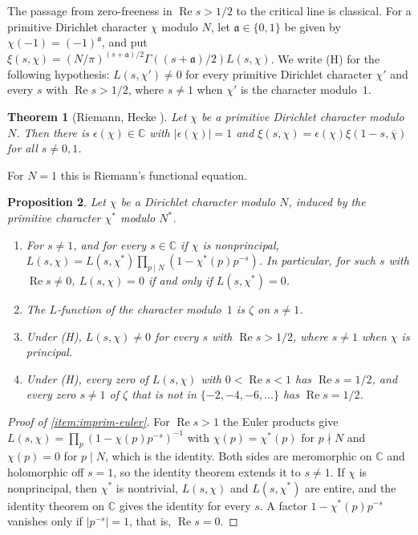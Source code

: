 \documentclass[11pt]{amsbook}
\theoremstyle{plain}
\newtheorem{theorem}{Theorem}[section]
\newtheorem{proposition}[theorem]{Proposition}
\theoremstyle{definition}
\theoremstyle{remark}
\numberwithin{equation}{section}
\numberwithin{figure}{chapter}
\numberwithin{table}{chapter}
\renewcommand{\C}{\mathbb{C}}
\begin{document}
The passage from zero-freeness in $\operatorname{Re}s>1/2$ to the
critical line is classical. For a primitive Dirichlet character $\chi$
modulo $N$, let $\mathfrak a\in\{0,1\}$ be given by
$\chi(-1)=(-1)^{\mathfrak a}$, and put
$\xi(s,\chi)=(N/\pi)^{(s+\mathfrak a)/2}\Gamma((s+\mathfrak a)/2)
L(s,\chi)$.
We write (H) for the following hypothesis: $L(s,\chi')\ne0$ for every
primitive Dirichlet character $\chi'$ and every $s$ with
$\operatorname{Re}s>1/2$, where $s\ne1$ when $\chi'$ is the character
modulo~$1$.

\begin{theorem}[Riemann, Hecke \cite{Davenport2000,Riemann1859}]
\label{thm:fe}
Let $\chi$ be a primitive Dirichlet character modulo $N$. Then there is
$\epsilon(\chi)\in\C$ with $|\epsilon(\chi)|=1$ and
$\xi(s,\chi)=\epsilon(\chi)\xi(1-s,\overline\chi)$ for all $s\ne0,1$.
\end{theorem}

\noindent For $N=1$ this is Riemann's functional equation.

\begin{proposition}\label{prop:imprimitive}
Let $\chi$ be a Dirichlet character modulo $N$, induced by the
primitive character $\chi^*$ modulo $N^*$.
\begin{enumerate}[label=(\alph*)]
\item\label{item:imprim-euler} For $s\ne1$, and for every $s\in\C$ if
$\chi$ is nonprincipal,
$L(s,\chi)=L(s,\chi^*)\prod_{p\mid N}(1-\chi^*(p)p^{-s})$. In
particular, for such $s$ with $\operatorname{Re}s\ne0$, $L(s,\chi)=0$
if and only if $L(s,\chi^*)=0$.
\item\label{item:imprim-zeta} The $L$-function of the character
modulo~$1$ is $\zeta$ on $s\ne1$.
\item\label{item:imprim-all} Under (H), $L(s,\chi)\ne0$ for every $s$
with $\operatorname{Re}s>1/2$, where $s\ne1$ when $\chi$ is
principal.
\item\label{item:imprim-line} Under (H), every zero of $L(s,\chi)$
with $0<\operatorname{Re}s<1$ has $\operatorname{Re}s=1/2$, and every
zero $s\ne1$ of $\zeta$ that is not in $\{-2,-4,-6,\dots\}$ has
$\operatorname{Re}s=1/2$.
\end{enumerate}
\end{proposition}

\begin{proof}[Proof of \ref{item:imprim-euler}]
For $\operatorname{Re}s>1$ the Euler products give
$L(s,\chi)=\prod_p(1-\chi(p)p^{-s})^{-1}$ with $\chi(p)=\chi^*(p)$ for
$p\nmid N$ and $\chi(p)=0$ for $p\mid N$, which is the identity. Both
sides are meromorphic on $\C$ and holomorphic off $s=1$, so the
identity theorem extends it to $s\ne1$. If $\chi$ is nonprincipal,
then $\chi^*$ is nontrivial, $L(s,\chi)$ and $L(s,\chi^*)$ are entire,
and the identity theorem on $\C$ gives the identity for every $s$. A
factor $1-\chi^*(p)p^{-s}$ vanishes only if $|p^{-s}|=1$, that is,
$\operatorname{Re}s=0$.
\end{proof}
\end{document}
